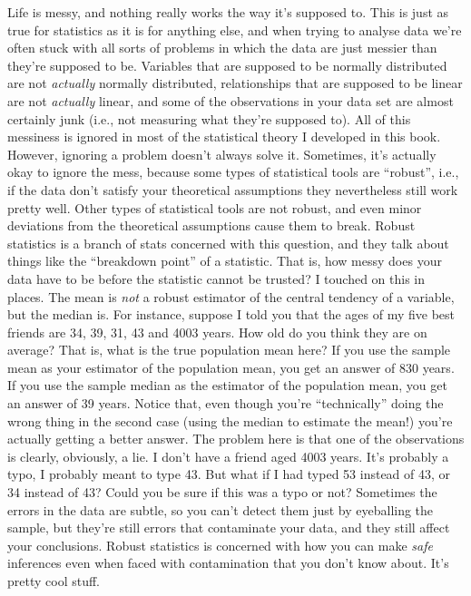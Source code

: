 \begin{itemize}
 Life is messy, and nothing really works the way it's supposed to. This is just as true for statistics as it is for anything else, and when trying to analyse data we're often stuck with all sorts of problems in which the data are just messier than they're supposed to be. Variables that are supposed to be normally distributed are not {\it actually} normally distributed, relationships that are supposed to be linear are not {\it actually} linear, and some of the observations in your data set are almost certainly junk (i.e., not measuring what they're supposed to). All of this messiness is ignored in most of the statistical theory I developed in this book. However, ignoring a problem doesn't always solve it. Sometimes, it's actually okay to ignore the mess, because some types of statistical tools are ``robust'', i.e., if the data don't satisfy your theoretical assumptions they nevertheless still work pretty well. Other types of statistical tools are not robust, and even minor deviations from the theoretical assumptions cause them to break. Robust statistics is a branch of stats concerned with this question, and they talk about things like the ``breakdown point'' of a statistic. That is, how messy does your data have to be before the statistic cannot be trusted? I touched on this in places. The mean is {\it not} a robust estimator of the central tendency of a variable, but the median is. For instance, suppose I told you that the ages of my five best friends are 34, 39, 31, 43 and 4003 years. How old do you think they are on average? That is, what is the true population mean here? If you use the sample mean as your estimator of the population mean, you get an answer of 830 years. If you use the sample median as the estimator of the population mean, you get an answer of 39 years. Notice that, even though you're ``technically'' doing the wrong thing in the second case (using the median to estimate the mean!) you're actually getting a better answer. The problem here is that one of the observations is clearly, obviously, a lie. I don't have a friend aged 4003 years. It's probably a typo, I probably meant to type 43. But what if I had typed 53 instead of 43, or 34 instead of 43? Could you be sure if this was a typo or not? Sometimes the errors in the data are subtle, so you can't detect them just by eyeballing the sample, but they're still errors that contaminate your data, and they still affect your conclusions. Robust statistics is concerned with how you can make {\it safe} inferences even when faced with contamination that you don't know about. It's pretty cool stuff.

\end{itemize}

